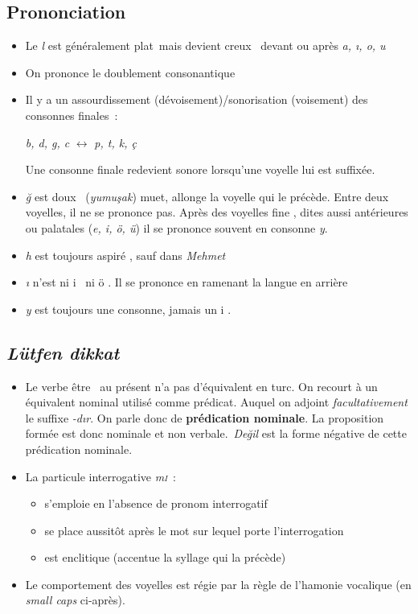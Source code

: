 \documentclass{cours}
\newcommand{\ch}{\c{s}}
\newcommand{\ug}{\u{g}}
\newcommand{\sci}{\textsc{i}}
\begin{document}
\subsection{Prononciation}
\begin{itemize}
    \item Le \textsl{l} est généralement \og plat\fg\ mais devient \og creux \fg\ devant ou après \textsl{a, \i, o, u}
    \item On prononce le doublement consonantique
    \item Il y a un assourdissement (dévoisement)/sonorisation (voisement) des consonnes finales~:
          \begin{center}
              \textsl{b, d, g, c} $\leftrightarrow$ \textsl{p, t, k, ç}
          \end{center}
          Une consonne finale redevient sonore lorsqu'une voyelle lui est suffixée.
    \item \textsl{\ug} est \og doux \fg\ (\textsl{yumu\ch ak}) muet, allonge la voyelle qui le précède. Entre deux voyelles, il ne se prononce pas. Après des voyelles \og fine \fg, dites aussi antérieures ou palatales (\textsl{e, i, ö, ü}) il se prononce souvent en consonne \textsl{y}.
    \item \textsl{h} est toujours \og aspiré \fg, sauf dans \textsl{Mehmet}
    \item \textsl{\i} n'est ni \og i \fg\ ni \og ö \fg. Il se prononce en ramenant la langue en arrière
    \item \textsl{y} est toujours une consonne, jamais un \og i \fg.
\end{itemize}

\subsection{\textsl{Lütfen dikkat}}
\begin{itemize}
    \item Le verbe \og être \fg\ au présent n'a pas d'équivalent en turc. 
	    On recourt à un équivalent nominal utilisé comme prédicat. 
	    Auquel on adjoint \emph{facultativement} le suffixe \textsl{-d\i r}. 
	    On parle donc de {\bf prédication nominale}. 
	    La proposition formée est donc nominale et non verbale.\ \textsl{De\ug il} est la forme négative de cette prédication nominale.
    \item La particule interrogative \textsl{m\sci}~:
          \begin{itemize}
              \item s'emploie en l'absence de pronom interrogatif
              \item se place aussitôt après le mot sur lequel porte l'interrogation
              \item est enclitique (accentue la syllage qui la précède)
          \end{itemize}
    \item Le comportement des voyelles est régie par la règle de l'hamonie vocalique (en \textsl{small caps} ci-après).
\end{itemize}
\end{document}
